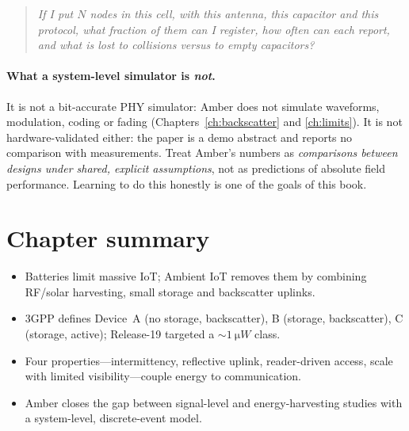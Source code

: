 \begin{quote}
\emph{If I put $N$ nodes in this cell, with this antenna, this capacitor and this
protocol, what fraction of them can I register, how often can each report, and
what is lost to collisions versus to empty capacitors?}
\end{quote}

\paragraph{What a system-level simulator is \emph{not}.}
It is not a bit-accurate PHY simulator: Amber does not simulate waveforms,
modulation, coding or fading (Chapters~\ref{ch:backscatter} and
\ref{ch:limits}). It is not hardware-validated either: the paper is a demo
abstract and reports no comparison with measurements. Treat Amber's numbers as
\emph{comparisons between designs under shared, explicit assumptions}, not as
predictions of absolute field performance. Learning to do this honestly is one
of the goals of this book.

\section{Chapter summary}

\begin{itemize}
 \item Batteries limit massive IoT; Ambient IoT removes them by combining RF/solar
   harvesting, small storage and backscatter uplinks.
 \item 3GPP defines Device~A (no storage, backscatter), B (storage,
   backscatter), C (storage, active); Release-19 targeted a $\sim\SI{1}{\micro W}$
   class.
 \item Four properties---intermittency, reflective uplink, reader-driven access,
   scale with limited visibility---couple energy to communication.
 \item Amber closes the gap between signal-level and energy-harvesting studies
   with a system-level, discrete-event model.
\end{itemize}

